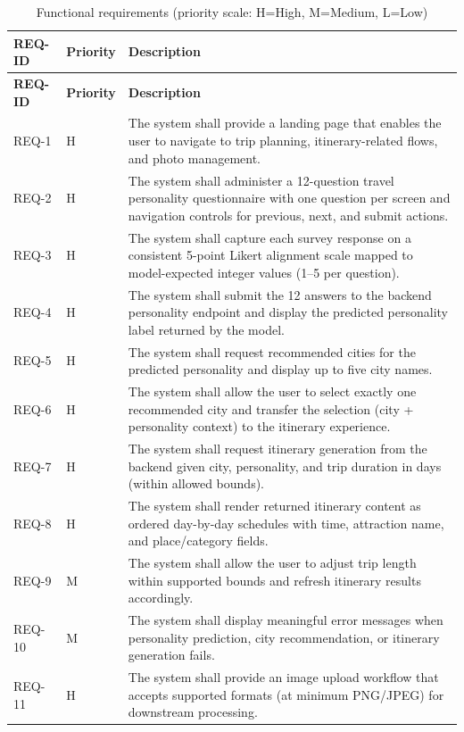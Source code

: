 \documentclass[12pt,oneside,openany]{report}
\begin{document}
\begin{longtable}{|p{}|p{}|p{}|}
\caption{Functional requirements (priority scale: H=High, M=Medium, L=Low)\label{tab:freq}}\\
\hline
\textbf{REQ-ID} & \textbf{Priority} & \textbf{Description} \\
\hline
\endfirsthead
\hline
\textbf{REQ-ID} & \textbf{Priority} & \textbf{Description} \\
\hline
\endhead
\hline
\endfoot

REQ-1 & H & The system shall provide a landing page that enables the user to navigate to trip planning, itinerary-related flows, and photo management. \\
\hline
REQ-2 & H & The system shall administer a 12-question travel personality questionnaire with one question per screen and navigation controls for previous, next, and submit actions. \\
\hline
REQ-3 & H & The system shall capture each survey response on a consistent 5-point Likert alignment scale mapped to model-expected integer values (1--5 per question). \\
\hline
REQ-4 & H & The system shall submit the 12 answers to the backend personality endpoint and display the predicted personality label returned by the model. \\
\hline
REQ-5 & H & The system shall request recommended cities for the predicted personality and display up to five city names. \\
\hline
REQ-6 & H & The system shall allow the user to select exactly one recommended city and transfer the selection (city + personality context) to the itinerary experience. \\
\hline
REQ-7 & H & The system shall request itinerary generation from the backend given city, personality, and trip duration in days (within allowed bounds). \\
\hline
REQ-8 & H & The system shall render returned itinerary content as ordered day-by-day schedules with time, attraction name, and place/category fields. \\
\hline
REQ-9 & M & The system shall allow the user to adjust trip length within supported bounds and refresh itinerary results accordingly. \\
\hline
REQ-10 & M & The system shall display meaningful error messages when personality prediction, city recommendation, or itinerary generation fails. \\
\hline
REQ-11 & H & The system shall provide an image upload workflow that accepts supported formats (at minimum PNG/JPEG) for downstream processing. \\

\end{longtable}
\end{document}
